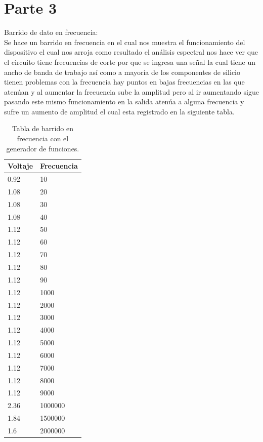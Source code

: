 \documentclass[12pt]{report}
\begin{document}
\section{Parte 3}
Barrido de dato en frecuencia:\\
Se hace un barrido en frecuencia en el cual nos muestra el funcionamiento del dispositivo el cual nos arroja como resultado el análisis espectral nos hace ver que el circuito tiene frecuencias de corte por que se ingresa una señal la cual tiene un ancho de banda de trabajo así como a mayoría de los componentes de silicio tienen problemas con la frecuencia hay puntos en bajas frecuencias en las que atenúan y al aumentar la frecuencia sube la amplitud pero  al ir aumentando sigue pasando este mismo funcionamiento en la salida atenúa a alguna frecuencia y sufre un aumento de amplitud el cual esta registrado en la siguiente tabla.\\
\begin{table}[htbp]
\begin{center}
\begin{tabular}{|l|l|}
\hline
Voltaje & Frecuencia \\
\hline \hline
0.92  & 10\\ \hline
1.08  & 20\\ \hline
1.08  & 30 \\ \hline
1.08  & 40\\ \hline
1.12  & 50 \\ \hline
1.12  & 60 \\ \hline
1.12  & 70 \\ \hline
1.12  & 80 \\ \hline
1.12  & 90 \\ \hline
1.12  & 1000 \\ \hline
1.12  & 2000 \\ \hline
1.12  & 3000 \\ \hline
1.12  & 4000\\ \hline
1.12  & 5000 \\ \hline
1.12  & 6000 \\ \hline
1.12  & 7000 \\ \hline
1.12  & 8000 \\ \hline
1.12  & 9000\\ \hline
2.36  & 1000000 \\ \hline
1.84  & 1500000 \\ \hline
1.6   & 2000000 \\ \hline
\end{tabular}
\caption{Tabla de barrido en frecuencia con el generador de funciones.}

\label{tabla:sencilla}
\end{center}
\end{table}
\end{document}

